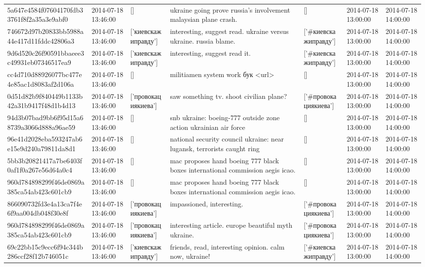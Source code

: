 \begin{tabular}{lllllll}
5a647e4584f07604170fdb33761f8f2a35a3e9abf0 & 2014-07-18 13:46:00 & [] & ukraine going prove russia's involvement malaysian plane crash. & [] & 2014-07-18 13:00:00 & 2014-07-18 14:00:00 \\
746672d97b20833bb5988a44e417d11fddc42806a3 & 2014-07-18 13:46:00 & ['киевскажиправду'] & interesting, suggest read. ukraine versus ukraine. russia blame. & ['#киевскажиправду'] & 2014-07-18 13:00:00 & 2014-07-18 14:00:00 \\
9d6d520c26f90591bbaeee3c49931eb07346517ea9 & 2014-07-18 13:46:00 & ['киевскажиправду'] & interesting, suggest read it. & ['#киевскажиправду'] & 2014-07-18 13:00:00 & 2014-07-18 14:00:00 \\
cc4d710d88926077bc477e4e85ac1d8083af2d106a & 2014-07-18 13:46:00 & [] & militiamen system work бук <url> & [] & 2014-07-18 13:00:00 & 2014-07-18 14:00:00 \\
0d51d82b9f840449b1133b42a31b9417f48d1b4d13 & 2014-07-18 13:46:00 & ['провокациякиева'] & saw something tv. shoot civilian plane? & ['#провокациякиева'] & 2014-07-18 13:00:00 & 2014-07-18 14:00:00 \\
94d3b07bad9bb6f95d15a68739a3066d888a96ae59 & 2014-07-18 13:46:00 & [] & snb ukraine: boeing-777 outside zone action ukrainian air force & [] & 2014-07-18 13:00:00 & 2014-07-18 14:00:00 \\
96e41d2028eba593247ab6e15e9d240a79811da8d1 & 2014-07-18 13:46:00 & [] & national security council ukraine: near lugansk, terrorists caught ring & [] & 2014-07-18 13:00:00 & 2014-07-18 14:00:00 \\
5bb3b20821417a7be6403f0af1f0a267e56d64a0c4 & 2014-07-18 13:46:00 & [] & mac proposes hand boeing 777 black boxes international commission aegis icao. & [] & 2014-07-18 13:00:00 & 2014-07-18 14:00:00 \\
960d784898299f46de0869a385ca54ab423c601cb9 & 2014-07-18 13:46:00 & [] & mac proposes hand boeing 777 black boxes international commission aegis icao. & [] & 2014-07-18 13:00:00 & 2014-07-18 14:00:00 \\
866090732fd3e4a13ca7f4e6f9aa004db048f30e8f & 2014-07-18 13:46:00 & ['провокациякиева'] & impassioned, interesting. & ['#провокациякиева'] & 2014-07-18 13:00:00 & 2014-07-18 14:00:00 \\
960d784898299f46de0869a385ca54ab423c601cb9 & 2014-07-18 13:46:00 & ['провокациякиева'] & interesting article. europe beautiful myth ukraine. & ['#провокациякиева'] & 2014-07-18 13:00:00 & 2014-07-18 14:00:00 \\
69c22bb15c9ecc6f94c344b286ccf28f12b746051c & 2014-07-18 13:46:00 & ['киевскажиправду'] & friends, read, interesting opinion. calm now, ukraine! & ['#киевскажиправду'] & 2014-07-18 13:00:00 & 2014-07-18 14:00:00 \\

\end{tabular}
